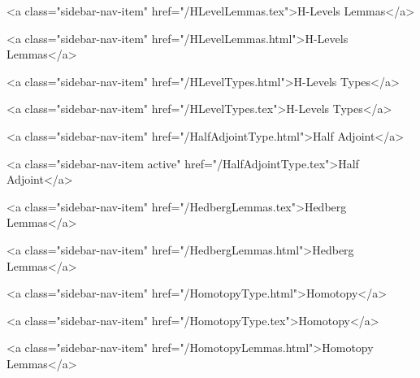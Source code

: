       
        
          <a class="sidebar-nav-item" href="/HLevelLemmas.tex">H-Levels Lemmas</a>
        
      
    
      
        
          <a class="sidebar-nav-item" href="/HLevelLemmas.html">H-Levels Lemmas</a>
        
      
    
      
        
          <a class="sidebar-nav-item" href="/HLevelTypes.html">H-Levels Types</a>
        
      
    
      
        
          <a class="sidebar-nav-item" href="/HLevelTypes.tex">H-Levels Types</a>
        
      
    
      
        
          <a class="sidebar-nav-item" href="/HalfAdjointType.html">Half Adjoint</a>
        
      
    
      
        
          <a class="sidebar-nav-item active" href="/HalfAdjointType.tex">Half Adjoint</a>
        
      
    
      
        
          <a class="sidebar-nav-item" href="/HedbergLemmas.tex">Hedberg Lemmas</a>
        
      
    
      
        
          <a class="sidebar-nav-item" href="/HedbergLemmas.html">Hedberg Lemmas</a>
        
      
    
      
        
          <a class="sidebar-nav-item" href="/HomotopyType.html">Homotopy</a>
        
      
    
      
        
          <a class="sidebar-nav-item" href="/HomotopyType.tex">Homotopy</a>
        
      
    
      
        
          <a class="sidebar-nav-item" href="/HomotopyLemmas.html">Homotopy Lemmas</a>
        
      
    

